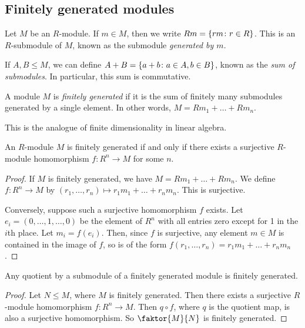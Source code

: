 \subsection{Finitely generated modules}
\begin{definition}
	Let \( M \) be an \( R \)-module.
	If \( m \in M \), then we write \( Rm = \qty{rm \colon r \in R} \).
	This is an \( R \)-submodule of \( M \), known as the submodule \textit{generated by \( m \)}.

	If \( A, B \leq M \), we can define \( A + B = \qty{a + b \colon a \in A, b \in B} \), known as the \textit{sum of submodules}.
	In particular, this sum is commutative.
\end{definition}
\begin{definition}
	A module \( M \) is \textit{finitely generated} if it is the sum of finitely many submodules generated by a single element.
	In other words, \( M = Rm_1 + \dots + Rm_n \).
\end{definition}
This is the analogue of finite dimensionality in linear algebra.
\begin{lemma}
	An \( R \)-module \( M \) is finitely generated if and only if there exists a surjective \( R \)-module homomorphism \( f \colon R^n \to M \) for some \( n \).
\end{lemma}
\begin{proof}
	If \( M \) is finitely generated, we have \( M = Rm_1 + \dots + Rm_n \).
	We define \( f \colon R^n \to M \) by \( (r_1, \dots, r_n) \mapsto r_1 m_1 + \dots + r_n m_n \).
	This is surjective.

	Conversely, suppose such a surjective homomorphism \( f \) exists.
	Let \( e_i = (0, \dots, 1, \dots, 0) \) be the element of \( R^n \) with all entries zero except for 1 in the \( i \)th place.
	Let \( m_i = f(e_i) \).
	Then, since \( f \) is surjective, any element \( m \in M \) is contained in the image of \( f \), so is of the form \( f(r_1, \dots, r_n) = r_1 m_1 + \dots + r_n m_n \).
\end{proof}
\begin{corollary}
	Any quotient by a submodule of a finitely generated module is finitely generated.
\end{corollary}
\begin{proof}
	Let \( N \leq M \), where \( M \) is finitely generated.
	Then there exists a surjective \( R \)-module homomorphism \( f \colon R^n \to M \).
	Then \( q \circ f \), where \( q \) is the quotient map, is also a surjective homomorphism.
	So \( \faktor{M}{N} \) is finitely generated.
\end{proof}
